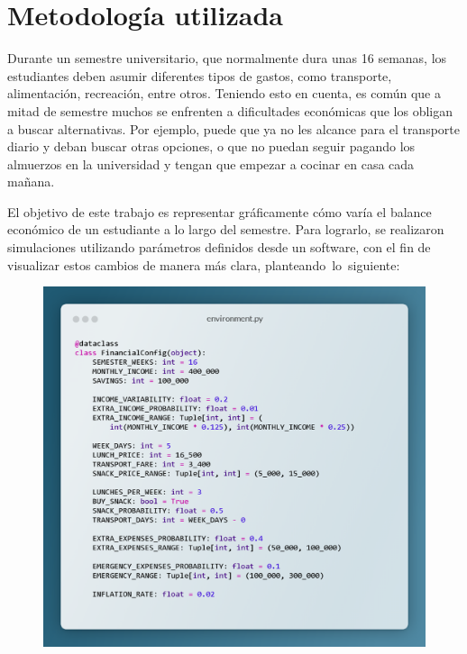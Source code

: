 \documentclass[letterpaper, 11pt]{report}
\begin{document}
\section{Metodología utilizada}

Durante un semestre universitario, que normalmente dura unas 16 semanas, los
estudiantes deben asumir diferentes tipos de gastos, como transporte,
alimentación, recreación, entre otros. Teniendo esto en cuenta, es común que a
mitad de semestre muchos se enfrenten a dificultades económicas que los obligan
a buscar alternativas. Por ejemplo, puede que ya no les alcance para el
transporte diario y deban buscar otras opciones, o que no puedan seguir pagando
los almuerzos en la universidad y tengan que empezar a cocinar en casa cada
mañana.

El objetivo de este trabajo es representar gráficamente cómo varía el balance
económico de un estudiante a lo largo del semestre. Para lograrlo, se
realizaron simulaciones utilizando parámetros definidos desde un software, con
el fin de visualizar estos cambios de manera más clara,
planteando lo siguiente:

\begin{figure}[H]
      \begin{center}
            \includegraphics[width=\linewidth]{./Images/environment_snippet.png}
            \caption{}
      \end{center}
\end{figure}
\end{document}
